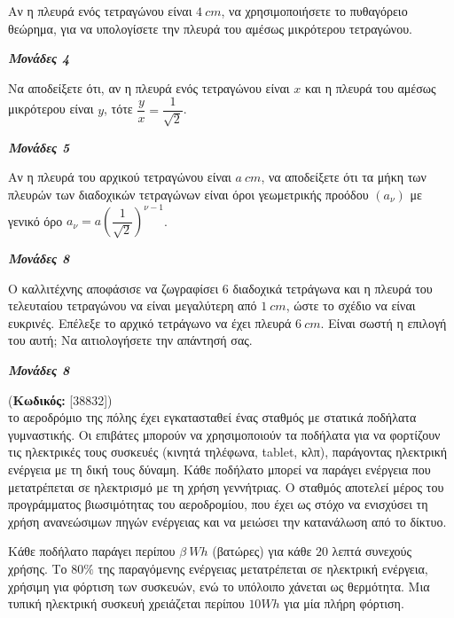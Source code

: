 \documentclass[11pt,a4paper,twoside]{book}
\newcounter{askhsh}[chapter]
\renewcommand{\theaskhsh}{
	\bf{\titlefont{\Large{\thechapter}}.\arabic{askhsh}}
}
\newcommand{\Askhsh}[2]{\refstepcounter{askhsh}{\titlefont{Άσκηση\theaskhsh} - \textcolor{maincolor}{ΘΕΜΑ #2}} (\small{\textbf{Κωδικός:} #1})\\}{}
\newcommand{\monades}[1]{
\hspace*{\fill}
\textbf{\textit{\textcolor{maincolor}{Μονάδες #1}}}}
\begin{document}
\begin{alist}
\item

\begin{rlist}
\item Αν η πλευρά ενός τετραγώνου είναι $4\ cm$, να χρησιμοποιήσετε το πυθαγόρειο θεώρημα, για να υπολογίσετε την πλευρά του αμέσως μικρότερου τετραγώνου.
\monades{4}
\item Να αποδείξετε ότι, αν η πλευρά ενός τετραγώνου είναι $x$ και η πλευρά του αμέσως μικρότερου είναι $y$, τότε $\dfrac{y}{x} = \dfrac{1}{\sqrt{2}}$.
\monades{5}
\end{rlist}
\item Αν η πλευρά του αρχικού τετραγώνου είναι $a\ cm$, να αποδείξετε ότι τα μήκη των πλευρών των διαδοχικών τετραγώνων είναι όροι γεωμετρικής προόδου $\left(a_{\nu}\right)$ με γενικό όρο $a_{\nu} = a \left(\dfrac{1}{\sqrt{2}}\right)^{\nu - 1}$.
\monades{8}
\item Ο καλλιτέχνης αποφάσισε να ζωγραφίσει 6 διαδοχικά τετράγωνα και η πλευρά του τελευταίου τετραγώνου να είναι μεγαλύτερη από $1\ cm$, ώστε το σχέδιο να είναι ευκρινές. Επέλεξε το αρχικό τετράγωνο να έχει πλευρά $6\ cm$. Είναι σωστή η επιλογή του αυτή; Να αιτιολογήσετε την απάντησή σας.
\monades{8}
\end{alist}

\vspace{4mm}

\Askhsh{[38832]}
Στο αεροδρόμιο της πόλης έχει εγκατασταθεί ένας σταθμός με στατικά ποδήλατα γυμναστικής. Οι επιβάτες μπορούν να χρησιμοποιούν τα ποδήλατα για να φορτίζουν τις ηλεκτρικές τους συσκευές (κινητά τηλέφωνα, tablet, κλπ), παράγοντας ηλεκτρική ενέργεια με τη δική τους δύναμη. Κάθε ποδήλατο μπορεί να παράγει ενέργεια που μετατρέπεται σε ηλεκτρισμό με τη χρήση γεννήτριας. Ο σταθμός αποτελεί μέρος του προγράμματος βιωσιμότητας του αεροδρομίου, που έχει ως στόχο να ενισχύσει τη χρήση ανανεώσιμων πηγών ενέργειας και να μειώσει την κατανάλωση από το δίκτυο.

Κάθε ποδήλατο παράγει περίπου $\beta\ Wh$ (βατώρες) για κάθε $20$ λεπτά συνεχούς χρήσης. Το $80\%$ της παραγόμενης ενέργειας μετατρέπεται σε ηλεκτρική ενέργεια, χρήσιμη για φόρτιση των συσκευών, ενώ το υπόλοιπο χάνεται ως θερμότητα. Μια τυπική ηλεκτρική συσκευή χρειάζεται περίπου $10Wh$ για μία πλήρη φόρτιση.
\end{document}
